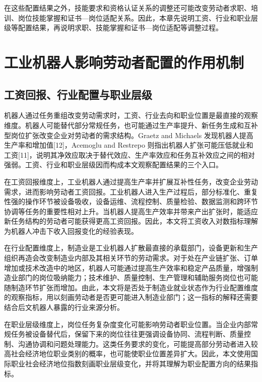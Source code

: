 \documentclass[UTF8, zihao=-4, a4paper, openany, fontset=none]{ctexrep}
\numberwithin{equation}{chapter}
\begin{document}
在这些配置结果之外，技能要求和资格认证关系的调整还可能改变劳动者求职、培训、岗位技能掌握和证书---岗位适配关系。因此，本章先说明工资、行业和职业层级等配置结果，再说明求职、技能掌握和证书---岗位适配等调整过程。

\section{工业机器人影响劳动者配置的作用机制}\label{ux5de5ux4e1aux673aux5668ux4ebaux5f71ux54cdux52b3ux52a8ux8005ux914dux7f6eux7684ux4f5cux7528ux673aux5236}

\subsection{工资回报、行业配置与职业层级}\label{ux5de5ux8d44ux56deux62a5ux884cux4e1aux914dux7f6eux4e0eux804cux4e1aux5c42ux7ea7}

机器人通过任务重组改变劳动需求时，工资、行业去向和职业位置是最直接的观察维度。机器人可能替代部分常规任务，也可能通过生产率提升、新任务生成和互补型岗位扩张改变企业对劳动者的需求结构。Graetz and Michaels 发现机器人提高生产率和增加值{[}12{]}，Acemoglu and Restrepo 则指出机器人扩张可能压低就业和工资{[}11{]}，说明其净效应取决于替代效应、生产率效应和任务互补效应之间的相对强弱。工资、行业和职业层级因而构成本文观察配置结果的三个入口。

在工资回报维度上，工业机器人通过提高生产率并扩展互补性任务，改变企业劳动需求，进而影响劳动者工资回报。工业机器人进入生产过程后，部分标准化、重复性强的操作环节被设备吸收，设备运维、流程控制、质量检验、数据监测和跨环节协调等任务的重要性相对上升。当机器人提高生产效率并带来产出扩张时，能适应新任务结构的劳动者可能获得更高工资回报。因此，本文将工资收入对数指标理解为机器人冲击下收入回报变化的经验表现。

在行业配置维度上，制造业是工业机器人扩散最直接的承载部门，设备更新和生产组织再造会改变制造业内部及其相关环节的劳动需求。对于处在产业链扩张、订单增加或技术改造中的地区，机器人可能通过提高生产效率和稳定产品质量，增强制造业部门的岗位吸纳能力；技术维护、质量控制、生产管理和辅助服务岗位也可能随制造环节扩张而增加。由此，本文将是否处于制造业就业状态作为行业配置维度的观察指标，用以刻画劳动者是否更可能进入制造业部门；这一指标的解释还需要结合后文机器人暴露的行业来源分析。

在职业层级维度上，岗位任务复杂度变化可能影响劳动者职业位置。当企业内部常规任务被设备替代后，保留下来的岗位往往更强调设备协同、流程判断、质量控制、沟通协调和问题处理能力。这类任务要求的变化，可能提高部分劳动者进入较高社会经济地位职业类别的概率，也可能使职业位置差异扩大。因此，本文使用国际职业社会经济地位指数刻画职业层级变化，并将其理解为职业配置方向的结果指标。
\end{document}

